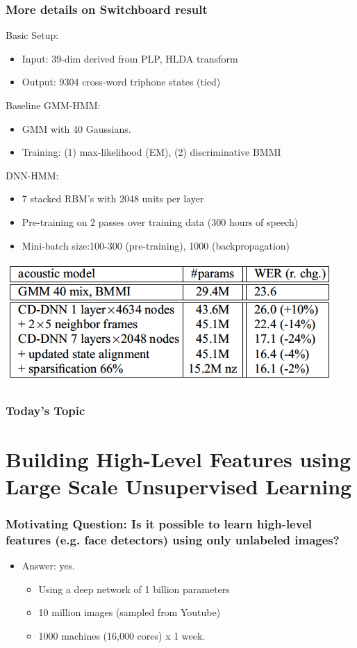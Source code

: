 \documentclass{beamer}
\newcommand{\bi}{\begin{itemize}}
\newcommand{\ei}{\end{itemize}}
\begin{document}
\begin{frame}
\frametitle{More details on Switchboard result \cite{seide11speech}}
Basic Setup:
\bi
\item Input: 39-dim derived from PLP, HLDA transform
\item Output: 9304 cross-word triphone states (tied)
\ei
Baseline GMM-HMM:
\bi
\item GMM with 40 Gaussians.	
\item Training: (1) max-likelihood (EM), (2) discriminative BMMI
\ei
DNN-HMM:
\bi
\item 7 stacked RBM's with 2048 units per layer
\item Pre-training on 2 passes over training data (300 hours of speech)
\item Mini-batch size:100-300 (pre-training), 1000 (backpropagation)
\ei
\centerline{\includegraphics[scale=0.45]{figs/seide11results}}
\end{frame}



\begin{frame}
\frametitle{Today's Topic}
\tableofcontents
\end{frame}

\section{Building High-Level Features using Large Scale Unsupervised Learning \cite{le12highlevel}}


\begin{frame}
\frametitle{Motivating Question: Is it possible to learn high-level features (e.g. face detectors) using only unlabeled images?}
\bi
\pause
\item Answer: yes. 
\pause
\bi
\item Using a deep network of 1 billion parameters
\item 10 million images (sampled from Youtube)
\item 1000 machines (16,000 cores) x 1 week.
\ei
\ei
\end{frame}
\end{document}
